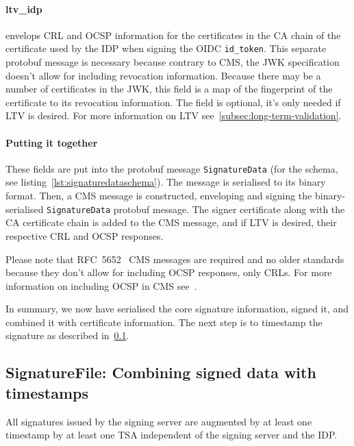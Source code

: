 \paragraph{ltv\_idp} envelops \gls{CRL} and \gls{OCSP} information for the certificates in the \gls{CA} chain of the certificate used by the \gls{IDP} when signing the \gls{OIDC} \texttt{id\_token}.
This separate protobuf message is necessary because contrary to \gls{CMS}, the \gls{JWK} specification~\cite{rfc7517} doesn't allow for including revocation information.
Because there may be a number of certificates in the \gls{JWK}, this field is a map of the fingerprint of the certificate to its revocation information.
The field is optional, it's only needed if \gls{LTV} is desired.
For more information on \gls{LTV} see~\ref{subsec:long-term-validation}.

\paragraph{Putting it together}

These fields are put into the protobuf message \texttt{SignatureData} (for the schema, see listing~\ref{lst:signaturedataschema}).
The message is serialised to its binary format.
Then, a \gls{CMS} message is constructed, enveloping and signing the binary-serialised \texttt{SignatureData} protobuf message.
The signer certificate along with the \gls{CA} certificate chain is added to the \gls{CMS} message, and if \gls{LTV} is desired,
their respective \gls{CRL} and \gls{OCSP} responses.

Please note that RFC~5652~\cite{rfc5652} \gls{CMS} messages are required and no older standards
because they don't allow for including \gls{OCSP} responses, only \gls{CRL}s.
For more information on including \gls{OCSP} in \gls{CMS} see~\cite[Section 10.2.1, RevocationInfoChoices and OtherRevocationInfoFormat]{rfc5652}.

In summary, we now have serialised the core signature information, signed it, and combined it with certificate information.
The next step is to timestamp the signature as described in~\ref{subsec:signaturefile:-combining-signed-data-with-timestamps}.

\subsection{SignatureFile: Combining signed data with timestamps}\label{subsec:signaturefile:-combining-signed-data-with-timestamps}
All signatures issued by the signing server are augmented by at least one timestamp by at least one \gls{TSA} independent of the signing server and the \gls{IDP}.

